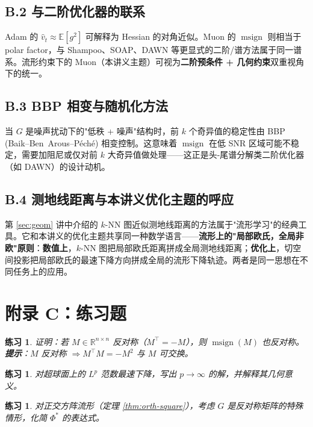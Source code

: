\documentclass[11pt,a4paper]{article}
\theoremstyle{mythm}
\theoremstyle{mydef}
\newtheorem{exercise}[theorem]{练习}
\newcommand{\R}{\mathbb{R}}
\newcommand{\E}{\mathbb{E}}
\newcommand{\msign}{\operatorname{msign}}
\begin{document}
\subsection*{B.2 与二阶优化器的联系}
Adam 的 $\hat v_t \approx \E[g^2]$ 可解释为 Hessian 的对角近似。Muon 的 $\msign$ 则相当于 polar factor，与 Shampoo、SOAP、DAWN 等更显式的二阶/谱方法属于同一谱系。流形约束下的 Muon（本讲义主题）可视为\textbf{二阶预条件 + 几何约束}双重视角下的统一。

\subsection*{B.3 BBP 相变与随机化方法}
当 $G$ 是噪声扰动下的"低秩 + 噪声"结构时，前 $k$ 个奇异值的稳定性由 BBP (Baik--Ben~Arous--Péché) 相变控制。这意味着 $\msign$ 在低 SNR 区域可能不稳定，需要加阻尼或仅对前 $k$ 大奇异值做处理——这正是头-尾谱分解类二阶优化器（如 DAWN）的设计动机。

\subsection*{B.4 测地线距离与本讲义优化主题的呼应}
第 \ref{sec:geom} 讲中介绍的 $k$-NN 图近似测地线距离的方法属于"流形学习"的经典工具。它和本讲义的优化主题共享同一种数学语言——\textbf{流形上的"局部欧氏，全局非欧"原则}：\textbf{数值上}，$k$-NN 图把局部欧氏距离拼成全局测地线距离；\textbf{优化上}，切空间投影把局部欧氏的最速下降方向拼成全局的流形下降轨迹。两者是同一思想在不同任务上的应用。

\section{附录 C：练习题}

\begin{exercise}\label{ex:msign-skew}
证明：若 $M\in\R^{n\times n}$ 反对称（$M^\top = -M$），则 $\msign(M)$ 也反对称。\\
\textbf{提示}：$M$ 反对称 $\Rightarrow M^\top M = -M^2$ 与 $M$ 可交换。
\end{exercise}

\begin{exercise}
对超球面上的 $L^p$ 范数最速下降，写出 $p\to\infty$ 的解，并解释其几何意义。
\end{exercise}

\begin{exercise}
对正交方阵流形（定理 \ref{thm:orth-square}），考虑 $G$ 是反对称矩阵的特殊情形，化简 $\Phi^\ast$ 的表达式。
\end{exercise}
\end{document}
